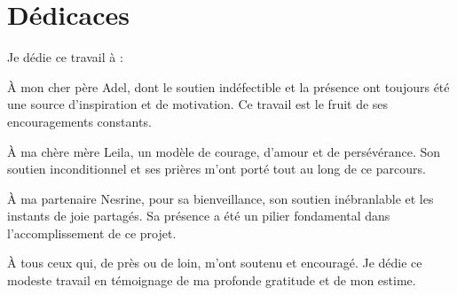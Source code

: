 \chapter*{\Huge Dédicaces}

\begingroup
\begin{center}
\large \raggedright Je dédie ce travail à :
\end{center}
\vspace{4mm}
\begin{center}
À mon cher père Adel, dont le soutien indéfectible et la présence ont toujours été une source d’inspiration et de motivation. Ce travail est le fruit de ses encouragements constants. \
\end{center}

\vspace{4mm}
\begin{center}
À ma chère mère Leila, un modèle de courage, d’amour et de persévérance. Son soutien inconditionnel et ses prières m’ont porté tout au long de ce parcours. \
\end{center}

\vspace{4mm}
\begin{center}
À ma partenaire Nesrine, pour sa bienveillance, son soutien inébranlable et les instants de joie partagés. Sa présence a été un pilier fondamental dans l’accomplissement de ce projet. \
\end{center}

\vspace{4mm}
\begin{center}
À tous ceux qui, de près ou de loin, m’ont soutenu et encouragé. Je dédie ce modeste travail en témoignage de ma profonde gratitude et de mon estime. \
\end{center}
\endgroup

\vspace{8mm}